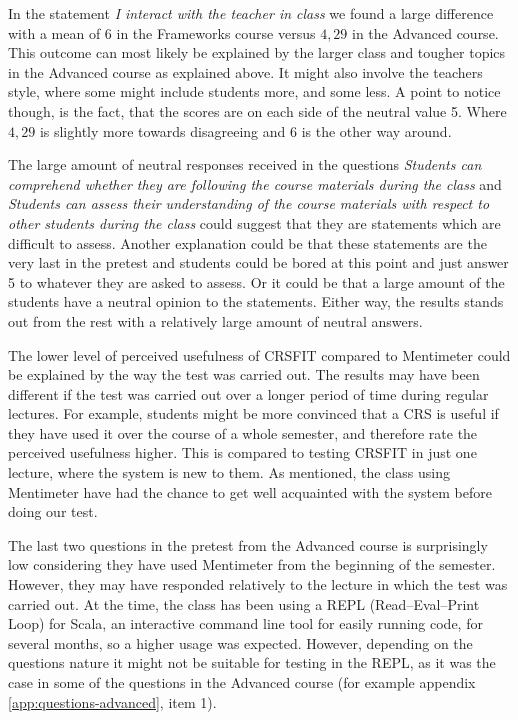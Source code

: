 
In the statement \emph{I interact with the teacher in class} we found a large difference with a mean of $6$ in the Frameworks course versus $4,29$ in the Advanced course. This outcome can most likely be explained by the larger class and tougher topics in the Advanced course as explained above. It might also involve the teachers style, where some might include students more, and some less. A point to notice though, is the fact, that the scores are on each side of the neutral value 5. Where $4,29$ is slightly more towards disagreeing and $6$ is the other way around.



The large amount of neutral responses received in the questions \emph{Students can comprehend whether they are following the course materials during the class} and \emph{Students can assess their understanding of the course materials with respect to other students during the class} could suggest that they are statements which are difficult to assess. Another explanation could be that these statements are the very last in the pretest and students could be bored at this point and just answer 5 to whatever they are asked to assess. Or it could be that a large amount of the students have a neutral opinion to the statements. Either way, the results stands out from the rest with a relatively large amount of neutral answers.



The lower level of perceived usefulness of CRSFIT compared to Mentimeter could be explained by the way the test was carried out. The results may have been different if the test was carried out over a longer period of time during regular lectures. For example, students might be more convinced that a CRS is useful if they have used it over the course of a whole semester, and therefore rate the perceived usefulness higher. This is compared to testing CRSFIT in just one lecture, where the system is new to them. As mentioned, the class using Mentimeter have had the chance to get well acquainted with the system before doing our test.


The last two questions in the pretest from the Advanced course is surprisingly low considering they have used Mentimeter from the beginning of the semester. However, they may have responded relatively to the lecture in which the test was carried out. At the time, the class has been using a REPL (Read–Eval–Print Loop) for Scala, an interactive command line tool for easily running code, for several months, so a higher usage was expected. However, depending on the questions nature it might not be suitable for testing in the REPL, as it was the case in some of the questions in the Advanced course (for example appendix \ref{app:questions-advanced}, item 1).



